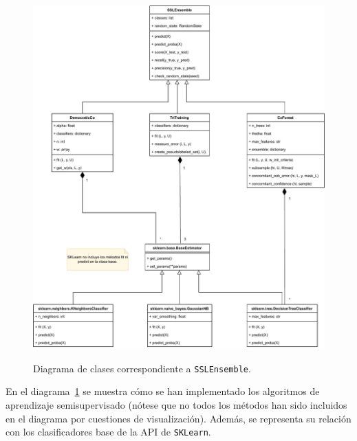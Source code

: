 \begin{figure}[h]
	\caption[Diagrama: clases (\texttt{SSLEnsemble})]{Diagrama de clases correspondiente a \texttt{SSLEnsemble}.}
	\centering
	\includegraphics[width=\textwidth]{../img/anexos/diagrams/classes-ssl}
	\label{c:classes-ssl}
\end{figure}

En el diagrama~\ref{c:classes-ssl} se muestra cómo se han implementado los algoritmos de aprendizaje semisupervisado (nótese que no todos los métodos han sido incluidos en el diagrama por cuestiones de visualización). Además, se representa su relación con los clasificadores base de la API de \texttt{SKLearn}.

